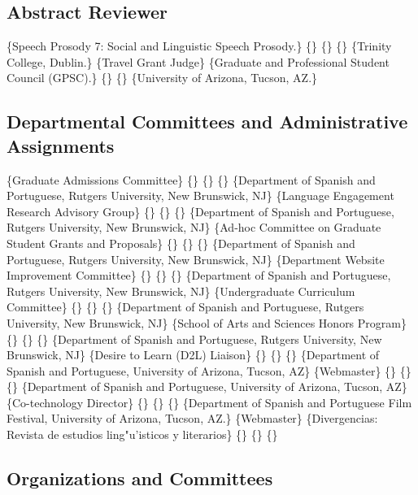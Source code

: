 \documentclass[11pt,letterpaper]{assets/tex/moderncv}
\begin{document}
\subsection{Abstract Reviewer}


\{Speech Prosody 7: Social and Linguistic Speech Prosody.\} \{\} \{\}
\{\} \{Trinity College, Dublin.\}  \{Travel Grant Judge\}
\{Graduate and Professional Student Council (GPSC).\} \{\} \{\}
\{University of Arizona, Tucson, AZ.\}

\subsection{Departmental Committees and Administrative Assignments}


\{Graduate Admissions Committee\} \{\} \{\} \{\} \{Department of Spanish
and Portuguese, Rutgers University, New Brunswick, NJ\}
 \{Language Engagement Research Advisory
Group\} \{\} \{\} \{\} \{Department of Spanish and Portuguese, Rutgers
University, New Brunswick, NJ\}  \{Ad-hoc
Committee on Graduate Student Grants and Proposals\} \{\} \{\} \{\}
\{Department of Spanish and Portuguese, Rutgers University, New
Brunswick, NJ\}  \{Department Website Improvement
Committee\} \{\} \{\} \{\} \{Department of Spanish and Portuguese,
Rutgers University, New Brunswick, NJ\} 
\{Undergraduate Curriculum Committee\} \{\} \{\} \{\} \{Department of
Spanish and Portuguese, Rutgers University, New Brunswick, NJ\}
 \{School of Arts and Sciences Honors Program\}
\{\} \{\} \{\} \{Department of Spanish and Portuguese, Rutgers
University, New Brunswick, NJ\}  \{Desire to Learn
(D2L) Liaison\} \{\} \{\} \{\} \{Department of Spanish and Portuguese,
University of Arizona, Tucson, AZ\}  \{Webmaster\}
\{\} \{\} \{\} \{Department of Spanish and Portuguese, University of
Arizona, Tucson, AZ\}  \{Co-technology Director\}
\{\} \{\} \{\} \{Department of Spanish and Portuguese Film Festival,
University of Arizona, Tucson, AZ.\} 
\{Webmaster\} \{Divergencias: Revista de estudios ling"u'isticos y
literarios\} \{\} \{\} \{\}

\subsection{Organizations and Committees}
\end{document}
